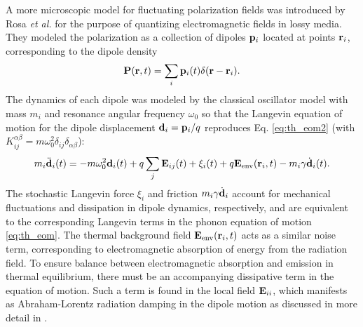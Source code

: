 A more microscopic model for fluctuating polarization fields was introduced by Rosa \textit{et al.} \cite{rosa10,rosa11} for the purpose of quantizing electromagnetic fields in lossy media. They modeled the polarization as a collection of dipoles $\mathbf{p}_i$ located at points $\mathbf{r}_i$, corresponding to the dipole density
\begin{equation}
 \mathbf{P}(\mathbf{r},t) = \sum_i \mathbf{p}_i(t) \delta(\mathbf{r}-\mathbf{r}_i).
\end{equation}
The dynamics of each dipole was modeled by the classical oscillator model with mass $m_i$ and resonance angular frequency $\omega_0$ so that the Langevin equation of motion for the dipole displacement $\mathbf{d}_i=\mathbf{p}_i/q$ reproduces Eq. \eqref{eq:th_eom2} (with $K_{ij}^{\alpha\beta}=m\omega_0^2\delta_{ij}\delta_{\alpha\beta}$): \cite{rosa10,rosa11}
\begin{equation}
 m_i \ddot{\mathbf{d}}_i(t) = - m \omega_0^2 \mathbf{d}_i(t) +q\sum_{j} \mathbf{E}_{ij}(t)+\xi_i(t)+ q\mathbf{E}_{\textrm{env}}(\mathbf{r}_i,t) - m_i \gamma \dot{\mathbf{d}}_i(t). \label{eq:th_eom2b}
\end{equation}
The stochastic Langevin force $\xi_i$ and friction $m_i\gamma \dot{\mathbf{d}}_i$ account for mechanical fluctuations and dissipation in dipole dynamics, respectively, and are equivalent to the corresponding Langevin terms in the phonon equation of motion \eqref{eq:th_eom}. The thermal background field $\mathbf{E}_{\textrm{env}}(\mathbf{r}_i,t)$ acts as a similar noise term, corresponding to electromagnetic absorption of energy from the radiation field. To ensure balance between electromagnetic absorption and emission in thermal equilibrium, there must be an accompanying dissipative term in the equation of motion. Such a term is found in the local field $\mathbf{E}_{ii}$, which manifests as Abraham-Lorentz radiation damping in the dipole motion \cite{jackson} as discussed in more detail in . 

